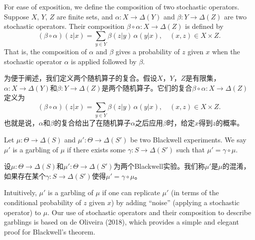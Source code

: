 \documentclass[12pt,a4paper]{article}
\newenvironment{original}
  {\par\vspace{4pt}\noindent\color{black}\ignorespaces}
  {\par\vspace{2pt}}
\newenvironment{translation}
  {\par\vspace{2pt}\noindent\color{myblue}\ignorespaces}
  {\par\vspace{6pt}}
\newcommand{\Delt}{\Delta}
\begin{document}
\begin{original}
For ease of exposition, we define the composition of two stochastic operators. Suppose $X$, $Y$, $Z$ are finite sets, and $\alpha:X\to\Delt(Y)$ and $\beta:Y\to\Delt(Z)$ are two stochastic operators. Their composition $\beta\circ\alpha:X\to\Delt(Z)$ is defined by
\begin{equation}
    (\beta\circ\alpha)(z|x) = \sum_{y\in Y} \beta(z|y)\,\alpha(y|x), \quad (x,z)\in X\times Z.
\end{equation}
That is, the composition of $\alpha$ and $\beta$ gives a probability of $z$ given $x$ when the stochastic operator $\alpha$ is applied followed by $\beta$.
\end{original}

\begin{translation}
为便于阐述，我们定义两个随机算子的复合。假设$X$，$Y$，$Z$是有限集，$\alpha:X\to\Delt(Y)$和$\beta:Y\to\Delt(Z)$是两个随机算子。它们的复合$\beta\circ\alpha:X\to\Delt(Z)$定义为
\begin{equation}
    (\beta\circ\alpha)(z|x) = \sum_{y\in Y} \beta(z|y)\,\alpha(y|x), \quad (x,z)\in X\times Z.
\end{equation}
也就是说，$\alpha$和$\beta$的复合给出了在随机算子$\alpha$之后应用$\beta$时，给定$x$得到$z$的概率。
\end{translation}

\begin{original}
Let $\mu:\Theta\to\Delt(S)$ and $\mu':\Theta\to\Delt(S')$ be two Blackwell experiments. We say $\mu'$ is a garbling of $\mu$ if there exists some $\gamma:S\to\Delt(S')$ such that $\mu'=\gamma\circ\mu$.
\end{original}

\begin{translation}
设$\mu:\Theta\to\Delt(S)$和$\mu':\Theta\to\Delt(S')$为两个Blackwell实验。我们称$\mu'$是$\mu$的混淆，如果存在某个$\gamma:S\to\Delt(S')$使得$\mu'=\gamma\circ\mu$。
\end{translation}

\begin{original}
Intuitively, $\mu'$ is a garbling of $\mu$ if one can replicate $\mu'$ (in terms of the conditional probability of $z$ given $x$) by adding ``noise'' (applying a stochastic operator) to $\mu$. Our use of stochastic operators and their composition to describe garblings is based on de Oliveira (2018), which provides a simple and elegant proof for Blackwell's theorem.
\end{original}
\end{document}
